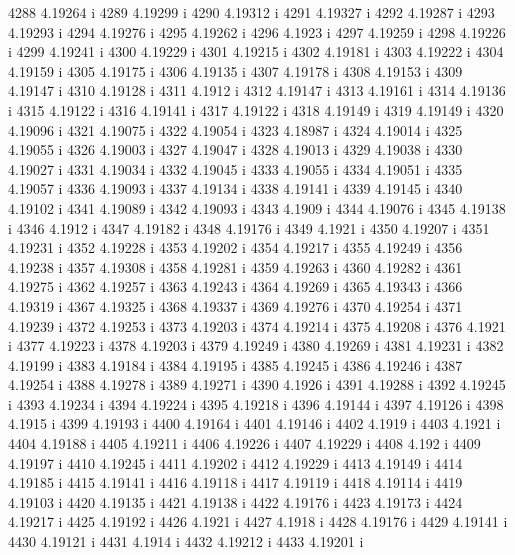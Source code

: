  4288  4.19264  i
 4289  4.19299  i
 4290  4.19312  i
 4291  4.19327  i
 4292  4.19287  i
 4293  4.19293  i
 4294  4.19276  i
 4295  4.19262  i
 4296  4.1923  i
 4297  4.19259  i
 4298  4.19226  i
 4299  4.19241  i
 4300  4.19229  i
 4301  4.19215  i
 4302  4.19181  i
 4303  4.19222  i
 4304  4.19159  i
 4305  4.19175  i
 4306  4.19135  i
 4307  4.19178  i
 4308  4.19153  i
 4309  4.19147  i
 4310  4.19128  i
 4311  4.1912  i
 4312  4.19147  i
 4313  4.19161  i
 4314  4.19136  i
 4315  4.19122  i
 4316  4.19141  i
 4317  4.19122  i
 4318  4.19149  i
 4319  4.19149  i
 4320  4.19096  i
 4321  4.19075  i
 4322  4.19054  i
 4323  4.18987  i
 4324  4.19014  i
 4325  4.19055  i
 4326  4.19003  i
 4327  4.19047  i
 4328  4.19013  i
 4329  4.19038  i
 4330  4.19027  i
 4331  4.19034  i
 4332  4.19045  i
 4333  4.19055  i
 4334  4.19051  i
 4335  4.19057  i
 4336  4.19093  i
 4337  4.19134  i
 4338  4.19141  i
 4339  4.19145  i
 4340  4.19102  i
 4341  4.19089  i
 4342  4.19093  i
 4343  4.1909  i
 4344  4.19076  i
 4345  4.19138  i
 4346  4.1912  i
 4347  4.19182  i
 4348  4.19176  i
 4349  4.1921  i
 4350  4.19207  i
 4351  4.19231  i
 4352  4.19228  i
 4353  4.19202  i
 4354  4.19217  i
 4355  4.19249  i
 4356  4.19238  i
 4357  4.19308  i
 4358  4.19281  i
 4359  4.19263  i
 4360  4.19282  i
 4361  4.19275  i
 4362  4.19257  i
 4363  4.19243  i
 4364  4.19269  i
 4365  4.19343  i
 4366  4.19319  i
 4367  4.19325  i
 4368  4.19337  i
 4369  4.19276  i
 4370  4.19254  i
 4371  4.19239  i
 4372  4.19253  i
 4373  4.19203  i
 4374  4.19214  i
 4375  4.19208  i
 4376  4.1921  i
 4377  4.19223  i
 4378  4.19203  i
 4379  4.19249  i
 4380  4.19269  i
 4381  4.19231  i
 4382  4.19199  i
 4383  4.19184  i
 4384  4.19195  i
 4385  4.19245  i
 4386  4.19246  i
 4387  4.19254  i
 4388  4.19278  i
 4389  4.19271  i
 4390  4.1926  i
 4391  4.19288  i
 4392  4.19245  i
 4393  4.19234  i
 4394  4.19224  i
 4395  4.19218  i
 4396  4.19144  i
 4397  4.19126  i
 4398  4.1915  i
 4399  4.19193  i
 4400  4.19164  i
 4401  4.19146  i
 4402  4.1919  i
 4403  4.1921  i
 4404  4.19188  i
 4405  4.19211  i
 4406  4.19226  i
 4407  4.19229  i
 4408  4.192  i
 4409  4.19197  i
 4410  4.19245  i
 4411  4.19202  i
 4412  4.19229  i
 4413  4.19149  i
 4414  4.19185  i
 4415  4.19141  i
 4416  4.19118  i
 4417  4.19119  i
 4418  4.19114  i
 4419  4.19103  i
 4420  4.19135  i
 4421  4.19138  i
 4422  4.19176  i
 4423  4.19173  i
 4424  4.19217  i
 4425  4.19192  i
 4426  4.1921  i
 4427  4.1918  i
 4428  4.19176  i
 4429  4.19141  i
 4430  4.19121  i
 4431  4.1914  i
 4432  4.19212  i
 4433  4.19201  i
